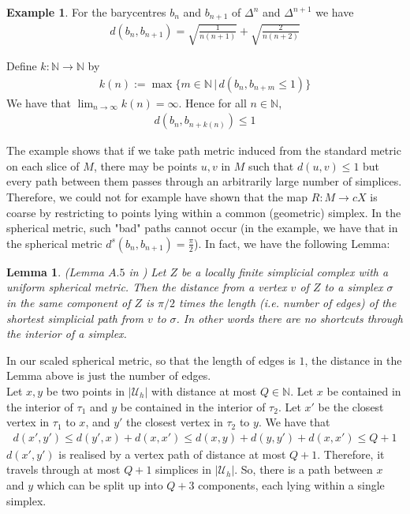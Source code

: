 \documentclass[a4paper,11pt]{article}
\theoremstyle{definition}
\newtheorem{example}[definition]{Example}
\theoremstyle{plain}
\newtheorem{lemma}[definition]{Lemma}
\theoremstyle{remark}
\begin{document}
{\begin{example}
For the barycentres $b_{n}$ and $b_{n+1}$ of $\Delta^n$ and $\Delta^{n+1}$ we have 
\begin{align*}
d(b_{n},b_{n+1}) = \sqrt{\frac{1}{n(n+1)}}+ \sqrt{\frac{2}{n(n+2)}}
\end{align*}

Define $k: \mathbb{N}\rightarrow \mathbb{N}$ by 
\begin{align*}
k(n):= \max\{m\in \mathbb{N}\,|\, d(b_{n},b_{n+m}\leq 1)\}
\end{align*}
We have that $\lim_{n\rightarrow \infty} k(n) = \infty$. Hence for all $n\in \mathbb{N}$,
\begin{align*}
d(b_{n},b_{n+k(n)})\leq 1
\end{align*}
\end{example}

The example shows that if we take path metric induced from the standard metric on each slice of $M$, there may be points $u,v$ in $M$ such that $d(u,v)\leq 1$ but every path between them passes through an arbitrarily large number of simplices. Therefore, we could not for example have shown that the map $R: M\rightarrow cX$ is coarse by restricting to points lying within a common (geometric) simplex. In the spherical metric, such "bad" paths cannot occur (in the example, we have that in the spherical metric $d^s(b_{n},b_{n+1}) = \frac{\pi}{2}$). In fact, we have the following Lemma:

\begin{lemma} \label{sphericals} (Lemma $A.5$ in \cite{wright2005coarse}) Let $Z$ be a locally finite simplicial complex with a uniform spherical metric. Then the distance from a vertex $v$ of $Z$ to a simplex $\sigma$ in the same component of $Z$ is $\pi/2$ times the length (i.e. number of edges) of the shortest simplicial path from $v$ to $\sigma$. In other words there are no shortcuts through the interior of a simplex. 
\end{lemma}

In our scaled spherical metric, so that the length of edges is $1$, the distance in the Lemma above is just the number of edges. \\

Let $x,y$ be two points in $|\mathcal{U}_{h}|$ with distance at most $Q\in \mathbb{N}$. Let $x$ be contained in the interior of $\tau_{1}$ and $y$ be contained in the interior of $\tau_2$. Let $x'$ be the closest vertex in $\tau_{1}$ to $x$, and $y'$ the closest vertex in $\tau_2$ to $y$.  We have that 
\begin{align*}
d(x',y')\leq d(y',x) + d(x,x') \leq d(x,y) + d(y,y') + d(x,x') \leq Q+1
\end{align*}
$d(x',y')$ is realised by a vertex path of distance at most  $Q+1$. Therefore, it travels through at most $Q+1$ simplices in $|\mathcal{U}_{h}|$. So, there is a path between $x$ and $y$ which can be split up into $Q+3$ components, each lying within a single simplex. \\

}
\end{document}
